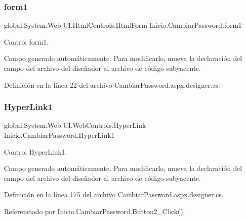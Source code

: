 \mbox{\label{classInicio_1_1CambiarPassword_a14ad331c75f392329019b277a2d2c8d9}} 
\subsubsection{\texorpdfstring{form1}{form1}}
{\footnotesize\ttfamily global.\+System.\+Web.\+U\+I.\+Html\+Controls.\+Html\+Form Inicio.\+Cambiar\+Password.\+form1\hspace{0.3cm}{\ttfamily [protected]}}



Control form1. 

Campo generado automáticamente. Para modificarlo, mueva la declaración del campo del archivo del diseñador al archivo de código subyacente. 

Definición en la línea 22 del archivo Cambiar\+Password.\+aspx.\+designer.\+cs.

\mbox{\label{classInicio_1_1CambiarPassword_a54fe9058b0b1415263161ac543de2e4f}} 
\subsubsection{\texorpdfstring{HyperLink1}{HyperLink1}}
{\footnotesize\ttfamily global.\+System.\+Web.\+U\+I.\+Web\+Controls.\+Hyper\+Link Inicio.\+Cambiar\+Password.\+Hyper\+Link1\hspace{0.3cm}{\ttfamily [protected]}}



Control Hyper\+Link1. 

Campo generado automáticamente. Para modificarlo, mueva la declaración del campo del archivo del diseñador al archivo de código subyacente. 

Definición en la línea 175 del archivo Cambiar\+Password.\+aspx.\+designer.\+cs.



Referenciado por Inicio.\+Cambiar\+Password.\+Button2\+\_\+\+Click().

\mbox{\label{classInicio_1_1CambiarPassword_ac4c5034d33d8290117987f9fc981e247}} 
